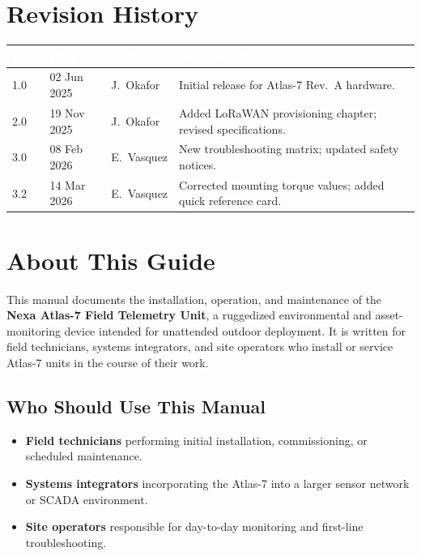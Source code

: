 \documentclass[11pt,a4paper,oneside,headings=big,chapterprefix=true]{scrreprt}
\newcommand{\revtable}[4]{#1 & #2 & #3 & #4 \\}
\begin{document}
\chapter*{Revision History}
\begin{center}
\renewcommand{\arraystretch}{1.3}
\begin{tabularx}{\textwidth}{@{}l l l X@{}}
\toprule
\rowcolor{steel}
\textcolor{white}{\bfseries Rev.} & \textcolor{white}{\bfseries Date} & \textcolor{white}{\bfseries Author} & \textcolor{white}{\bfseries Summary of Changes} \\
\midrule
\revtable{1.0}{02 Jun 2025}{J.\ Okafor}{Initial release for Atlas-7 Rev.\ A hardware.}
\revtable{2.0}{19 Nov 2025}{J.\ Okafor}{Added LoRaWAN provisioning chapter; revised specifications.}
\revtable{3.0}{08 Feb 2026}{E.\ Vasquez}{New troubleshooting matrix; updated safety notices.}
\rowcolor{fogbg}
\revtable{3.2}{14 Mar 2026}{E.\ Vasquez}{Corrected mounting torque values; added quick reference card.}
\bottomrule
\end{tabularx}
\end{center}

\tableofcontents

\chapter{About This Guide}
\label{ch:about}

This manual documents the installation, operation, and maintenance of the \textbf{Nexa Atlas-7 Field Telemetry Unit}, a ruggedized environmental and asset-monitoring device intended for unattended outdoor deployment. It is written for field technicians, systems integrators, and site operators who install or service Atlas-7 units in the course of their work.

\section{Who Should Use This Manual}

\begin{itemize}
  \item \textbf{Field technicians} performing initial installation, commissioning, or scheduled maintenance.
  \item \textbf{Systems integrators} incorporating the Atlas-7 into a larger sensor network or SCADA environment.
  \item \textbf{Site operators} responsible for day-to-day monitoring and first-line troubleshooting.
\end{itemize}
\end{document}
